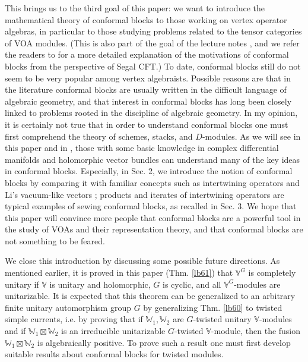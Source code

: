 \documentclass[11pt,b5paper,notitlepage]{article}
\theoremstyle{definition}
\theoremstyle{plain}
\newcommand{\Vbb}{\mathbb V}
\newcommand{\Wbb}{\mathbb W}
\numberwithin{equation}{section}
\begin{document}
This brings us to the third goal of this paper: we want to introduce the mathematical theory of conformal blocks to those working on vertex operator algebras, in particular to those studying problems related to the tensor categories of VOA modules. (This is also part of the goal of the lecture notes \cite{Gui23b}, and we refer the readers to \cite{Gui23b} for a more detailed explanation of the motivations of conformal blocks from the perspective of Segal CFT.) To date, conformal blocks still do not seem to be very popular among vertex algebraists. Possible reasons are that in the literature conformal blocks are usually written in the difficult language of algebraic geometry, and that interest in conformal blocks has long been closely linked to problems rooted in the discipline of algebraic geometry. In my opinion, it is certainly not true that in order to understand conformal blocks one must first comprehend the theory of schemes, stacks, and $D$-modules. As we will see in this paper and in \cite{Gui23b}, those with some basic knowledge in complex differential manifolds and holomorphic vector bundles can understand many of the key ideas in conformal blocks. Especially, in Sec. 2, we introduce the notion of conformal blocks by comparing it with familiar concepts such as intertwining operators and Li's vacuum-like vectors \cite{Li94}; products and iterates of intertwining operators are typical examples of sewing conformal blocks, as recalled in Sec. 3. We hope that this paper will convince more people that conformal blocks are a powerful tool in the study of VOAs and their representation theory, and that conformal blocks are not something to be feared.

We close this introduction by discussing some possible future directions. As mentioned earlier, it is proved in this paper (Thm. \ref{lb61}) that $\Vbb^G$ is completely unitary if $\Vbb$ is unitary and holomorphic, $G$ is cyclic, and all $\Vbb^G$-modules are unitarizable. It is expected that this theorem can be generalized to an arbitrary finite unitary automorphism group $G$ by generalizing Thm. \ref{lb60} to twisted simple currents, i.e. by proving that if $\Wbb_1,\Wbb_2$ are $G$-twisted unitary $\Vbb$-modules and if $\Wbb_1\boxtimes\Wbb_2$ is an irreducible unitarizable $G$-twisted $\Vbb$-module, then the fusion $\Wbb_1\boxtimes\Wbb_2$ is algebraically positive. To prove such a result one must first develop suitable results about conformal blocks for twisted modules.
\end{document}
